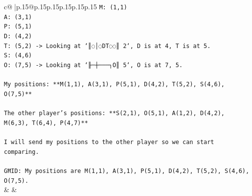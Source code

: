 \documentclass{article}
\begin{document}
{\begin{supertabular}{c@{$\;$}|p{.15\linewidth}@{}p{.15\linewidth}p{.15\linewidth}p{.15\linewidth}p{.15\linewidth}p{.15\linewidth}}
{{{\texttt{M: (1,1)} \\
\texttt{A: (3,1)} \\
\texttt{P: (5,1)} \\
\texttt{D: (4,2)} \\
\texttt{T: (5,2) {-}> Looking at `║◌│◌DT◌◌║ 2`, D is at 4, T is at 5.} \\
\texttt{S: (4,6)} \\
\texttt{O: (7,5) {-}> Looking at `╟─┼───┐O║ 5`, O is at 7, 5.} \\
\\ 
\texttt{My positions: **M(1,1), A(3,1), P(5,1), D(4,2), T(5,2), S(4,6), O(7,5)**} \\
\\ 
\texttt{The other player's positions: **S(2,1), O(5,1), A(1,2), D(4,2), M(6,3), T(6,4), P(4,7)**} \\
\\ 
\texttt{I will send my positions to the other player so we can start comparing.} \\
\\ 
\texttt{GĦID: My positions are M(1,1), A(3,1), P(5,1), D(4,2), T(5,2), S(4,6), O(7,5).} \\
            }
        }
    }
    & & \\ \\


\end{supertabular}}
\end{document}
